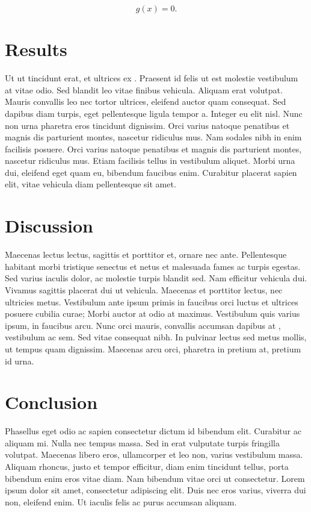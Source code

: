 \documentclass[12pt, aps, prb]{revtex4-2}
\begin{document}
\[
    g(x) = 0.
\]

\section{Results}
\label{sec:results}

Ut ut tincidunt erat, et ultrices ex \cite{baroni2001}. Praesent id felis ut est molestie vestibulum at vitae odio. Sed blandit leo vitae finibus vehicula. Aliquam erat volutpat. Mauris convallis leo nec tortor ultrices, eleifend auctor quam consequat. Sed dapibus diam turpis, eget pellentesque ligula tempor a. Integer eu elit nisl. Nunc non urna pharetra eros tincidunt dignissim. Orci varius natoque penatibus et magnis dis parturient montes, nascetur ridiculus mus. Nam sodales nibh in enim facilisis posuere. Orci varius natoque penatibus et magnis dis parturient montes, nascetur ridiculus mus. Etiam facilisis tellus in vestibulum aliquet. Morbi urna dui, eleifend eget quam eu, bibendum faucibus enim. Curabitur placerat sapien elit, vitae vehicula diam pellentesque sit amet.

\section{Discussion}
\label{sec:discussion}

Maecenas lectus lectus, sagittis et porttitor et, ornare nec ante. Pellentesque habitant morbi tristique senectus et netus et malesuada fames ac turpis egestas. Sed varius iaculis dolor, ac molestie turpis blandit sed. Nam efficitur vehicula dui. Vivamus sagittis placerat dui ut vehicula. Maecenas et porttitor lectus, nec ultricies metus. Vestibulum ante ipsum primis in faucibus orci luctus et ultrices posuere cubilia curae; Morbi auctor at odio at maximus. Vestibulum quis varius ipsum, in faucibus arcu. Nunc orci mauris, convallis accumsan dapibus at \citet{vaswani2023}, vestibulum ac sem. Sed vitae consequat nibh. In pulvinar lectus sed metus mollis, ut tempus quam dignissim. Maecenas arcu orci, pharetra in pretium at, pretium id urna.

\section{Conclusion}
\label{sec:conclusion}

Phasellus eget odio ac sapien consectetur dictum id bibendum elit. Curabitur ac aliquam mi. Nulla nec tempus massa. Sed in erat vulputate turpis fringilla volutpat. Maecenas libero eros, ullamcorper et leo non, varius vestibulum massa. Aliquam rhoncus, justo et tempor efficitur, diam enim tincidunt tellus, porta bibendum enim eros vitae diam. Nam bibendum vitae orci ut consectetur. Lorem ipsum dolor sit amet, consectetur adipiscing elit. Duis nec eros varius, viverra dui non, eleifend enim. Ut iaculis felis ac purus accumsan aliquam.


\end{document}
